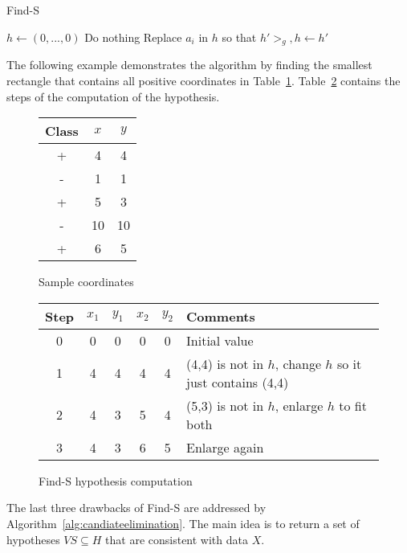 \documentclass{report}
\begin{document}
\begin{algorithm}
\caption{Find-S}
\label{alg:finds}
\begin{algorithmic}
\State $h \gets (0,...,0)$ 
\State Do nothing
\Else
\State Replace $a_i$ in $h$ so that $h' >_g, h\gets h'$
\EndIf
\EndFor
\EndFor
\\
\end{algorithmic}
\end{algorithm}

The following example demonstrates the algorithm by finding the smallest rectangle that contains all positive coordinates in Table~\ref{table:coordinates}. Table~\ref{table:findscomputation} contains the steps of the computation of the hypothesis.

\begin{figure}[h!]
\centering
\begin{tabular}{c||c|c}
Class & $x$ & $y$ \\
\hline
\hline
+ & 4 & 4 \\
- & 1 & 1 \\
+ & 5 & 3 \\
- & 10 & 10 \\
+ & 6 & 5
\end{tabular}
\caption{Sample coordinates}
\label{table:coordinates}
\end{figure}


\begin{figure}[h!]
\centering
\begin{tabular}{c||c|c|c|c||l}
Step & $x_1$ & $y_1$ & $x_2$ & $y_2$ & Comments \\
\hline
\hline
0 & 0 & 0 & 0 & 0 & Initial value \\
1 & 4 & 4 & 4 & 4 & (4,4) is not in $h$, change $h$ so it just contains (4,4) \\
2 & 4 & 3 & 5 & 4 & (5,3) is not in $h$, enlarge $h$ to fit both \\
3 & 4 & 3 & 6 & 5 &  Enlarge again
\end{tabular}
\caption{Find-S hypothesis computation}
\label{table:findscomputation}
\end{figure}


The last three drawbacks of Find-S are addressed by Algorithm~\ref{alg:candiateelimination}. The main idea is to return a set of hypotheses $VS\subseteq H$ that are consistent with data $X$.
\end{document}
